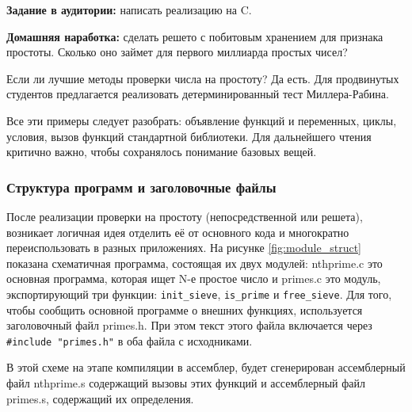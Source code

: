 \documentclass[a4paper,12pt,oneside]{article}
\newif\ifanswers
\begin{document}
\textbf{Задание в аудитории:} написать реализацию на C.

\ifanswers
Возможный ответ:

\begin{lstlisting}
int *
init_sieve (int nofprimes)
{
  int i, j;
  int *retval;

  retval = calloc (nofprimes, sizeof (int));

  for (i = 2; i * i < nofprimes; ++i)
    if (retval[i] == 0)
      for (j = i * i; j < nofprimes; j += i)
        retval[j] = 1;

  return retval;
}
\end{lstlisting}

Хорош ли этот ответ? В общем да, но следует обратить внимание, что он тратит примерно в 32 раза больше памяти, чем реально нужно для хранения однобитовых признаков.
\fi

\textbf{Домашняя наработка:} сделать решето с побитовым хранением для признака простоты. Сколько оно займет для первого миллиарда простых чисел?

Если ли лучшие методы проверки числа на простоту? Да есть. Для продвинутых студентов предлагается реализовать детерминированный тест Миллера-Рабина. 

Все эти примеры следует разобрать: объявление функций и переменных, циклы, условия, вызов функций стандартной библиотеки. Для дальнейшего чтения критично важно, чтобы сохранялось понимание базовых вещей.

\subsubsection{Структура программ и заголовочные файлы}\label{ProgramStructure}

После реализации проверки на простоту (непосредственной или решета), возникает логичная идея отделить её от основного кода и многократно переиспользовать в разных приложениях. На рисунке \ref{fig:module_struct} показана схематичная программа, состоящая их двух модулей: nthprime.c это основная программа, которая ищет N-е простое число и primes.c это модуль, экспортирующий три функции: \lstinline!init_sieve!, \lstinline!is_prime! и \lstinline!free_sieve!. Для того, чтобы сообщить основной программе о внешних функциях, используется заголовочный файл primes.h. При этом текст этого файла включается через \lstinline!#include "primes.h"! в оба файла с исходниками.

В этой схеме на этапе компиляции в ассемблер, будет сгенерирован ассемблерный файл nthprime.s содержащий вызовы этих функций и ассемблерный файл primes.s, содержащий их определения.
\end{document}

